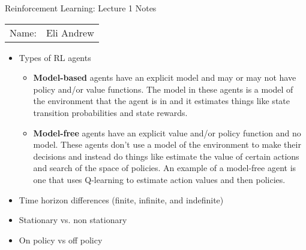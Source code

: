 \documentclass[12pt]{article}
\begin{document}
\begin{center}
{\Large Reinforcement Learning: Lecture 1 Notes}

\begin{tabular}{rl}
Name: & Eli Andrew
\end{tabular}
\end{center}

  \begin{itemize}
    \item Types of RL agents
    \begin{itemize}
      \item \textbf{Model-based} agents have an explicit model and may or may not
      have policy and/or value functions. The model in these agents is a model of
      the environment that the agent is in and it estimates things like state transition
      probabilities and state rewards.
      \item \textbf{Model-free} agents have an explicit value and/or policy function
      and no model. These agents don't use a model of the environment to make their
      decisions and instead do things like estimate the value of certain actions
      and search of the space of policies. An example of a model-free agent is one
      that uses Q-learning to estimate action values and then policies.
    \end{itemize}
    \item Time horizon differences (finite, infinite, and indefinite)
    \item Stationary vs. non stationary 
    \item On policy vs off policy

  \end{itemize}
\end{document}
